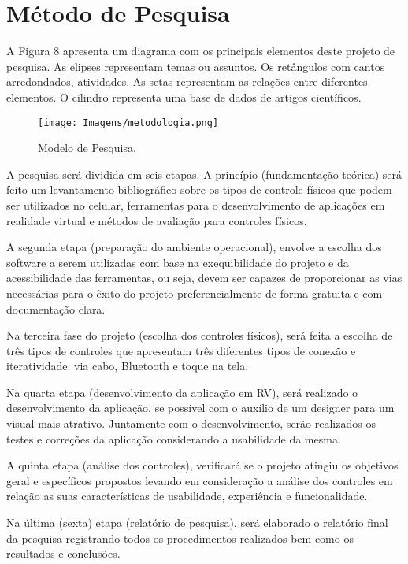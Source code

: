 \chapter{Método de Pesquisa}
\label{c.metodo}

A Figura 8 apresenta um diagrama com os principais elementos deste projeto de pesquisa. As elipses representam temas ou assuntos. Os retângulos com cantos arredondados, atividades. As setas representam as relações entre diferentes elementos. O cilindro representa uma base de dados de artigos científicos.

\begin{figure}[h]
	\caption{\small Modelo de Pesquisa.}
	\centering
	\texttt{[image: Imagens/metodologia.png]}
	\label{f.metodopesquisa}
\end{figure}

A pesquisa será dividida em seis etapas. A princípio (fundamentação teórica) será feito um levantamento bibliográfico sobre os tipos de controle físicos que podem ser utilizados no celular, ferramentas para o desenvolvimento de aplicações em realidade virtual e métodos de avaliação para controles físicos.
 
A segunda etapa (preparação do ambiente operacional), envolve a escolha dos software a serem utilizadas com base na exequibilidade do projeto e da acessibilidade das ferramentas, ou seja, devem ser capazes de proporcionar as vias necessárias para o êxito do projeto preferencialmente de forma gratuita e com documentação clara. 

Na terceira fase do projeto (escolha dos controles físicos), será feita a escolha de três tipos de controles que apresentam três diferentes tipos de conexão e iteratividade: via cabo, Bluetooth e toque na tela. 

Na quarta etapa (desenvolvimento da aplicação em RV), será realizado o desenvolvimento da aplicação, se possível com o auxílio de um designer para um visual mais atrativo. Juntamente com o desenvolvimento, serão realizados os testes e correções da aplicação considerando a usabilidade da mesma.
 
A quinta etapa (análise dos controles), verificará se o projeto atingiu os objetivos geral e específicos propostos levando em consideração a análise dos controles em relação as suas características de usabilidade, experiência e funcionalidade. 

Na última (sexta) etapa (relatório de pesquisa), será elaborado o relatório final da pesquisa registrando todos os procedimentos realizados bem como os resultados e conclusões.


